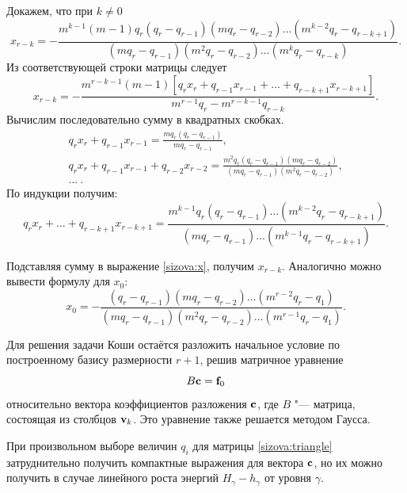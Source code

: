 Докажем, что при $k \ne 0$
\begin{equation}
x_{r - k} = -\frac{m^{k - 1}(m - 1)q_r\left(q_r - q_{r - 1}\right)\left(mq_r - q_{r - 2}\right)\ldots\left(m^{k - 2}q_r - q_{r - k + 1}\right)}{\left(m q_r - q_{r - 1}\right)\left(m^2 q_r - q_{r - 2}\right)\dots\left(m^k q_r - q_{r - k}\right)}. \label{sizova:x}
\end{equation}
Из соответствующей строки матрицы следует
$$
x_{r - k} = - \frac{m^{r - k - 1}(m - 1)\left[q_r x_r  + q_{r - 1} x_{r - 1} + \ldots + q_{r - k + 1} x_{r - k + 1}\right]}{m^{r - 1}q_r - m^{r - k - 1}q_{r - k}}.
$$
Вычислим последовательно сумму в квадратных скобках.
\begin{gather*}
q_r x_r  + q_{r - 1} x_{r - 1} = \frac{m q_r \left(q_r - q_{r - 1}\right)}{mq_r - q_{r - 1}},\\
q_r x_r  + q_{r - 1} x_{r - 1} + q_{r - 2} x_{r - 2} = \frac{m^2 q_r \left(q_r - q_{r - 1}\right)\left(m q_r - q_{r - 2}\right)}{\left(mq_r - q_{r - 1}\right)\left(m^2 q_r - q_{r - 2}\right)},\\
\ldots~.
\end{gather*}
По индукции получим:
$$
q_r x_r  + \ldots + q_{r - k + 1} x_{r - k + 1} = \frac{m^{k - 1} q_r \left(q_r - q_{r - 1}\right)\dots\left(m^{k - 2} q_r - q_{r - k + 1}\right)}{\left(mq_r - q_{r - 1}\right)\ldots\left(m^{k - 1} q_r - q_{r - k + 1}\right)}.
$$

Подставляя сумму в выражение \eqref{sizova:x}, получим $x_{r - k}$. Аналогично можно вывести формулу для $x_0$:
$$
x_0 = -\frac{\left(q_r - q_{r - 1}\right)\left(mq_r - q_{r - 2}\right)\ldots\left(m^{r - 2}q_r - q_1\right)}{\left(m q_r - q_{r - 1}\right)\left(m^2 q_r - q_{r - 2}\right)\ldots\left(m^{r - 1} q_r - q_1\right)}.
$$

Для решения задачи Коши остаётся разложить начальное условие по построенному базису размерности $r + 1$, решив матричное уравнение
\begin{equation}
B \bold c = \bold f_0 \label{sizova:sysbegcond}
\end{equation}
относительно вектора коэффициентов разложения $\bold c$, где $B$ "--- матрица, состоящая из столбцов $\bold v_k$. Это уравнение также решается методом Гаусса.

При произвольном выборе величин $q_i$ для матрицы \eqref{sizova:triangle} затруднительно получить компактные выражения для вектора $\bold c$, но их можно получить в случае линейного роста энергий $H_\gamma - h_\gamma$ от уровня $\gamma$.

\smallskip

